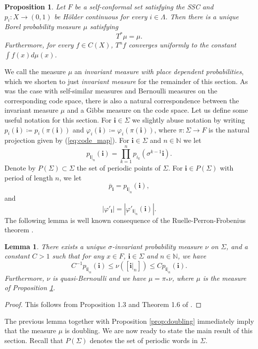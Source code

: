\documentclass{PRM}
\newcommand{\field}[1]{\mathbb{#1}}
\newcommand{\N}{\field{N}}
\theoremstyle{plain}
\newtheorem{lemma}[thm]{Lemma}
\newtheorem{prop}[thm]{Proposition}
\theoremstyle{definition}
\theoremstyle{remark}
\begin{document}
\begin{prop}\label{prop:invmeas}
Let $F$ be a self-conformal set satisfying the SSC and $p_i\colon X\to (0,1)$ be Hölder continuous for every $i\in\Lambda$. Then there is a unique Borel probability measure $\mu$ satisfying
\begin{equation*}
    T^*\mu=\mu.
\end{equation*}
Furthermore, for every $f\in C(X)$, $T^nf$ converges uniformly to the constant $\int f(x)d \mu(x)$.
\end{prop}
We call the measure $\mu$ an \emph{invariant measure with place dependent probabilities}, which we shorten to just \emph{invariant measure} for the remainder of this section. As was the case with self-similar measures and Bernoulli measures on the corresponding code space, there is also a natural correspondence between the invariant measure $\mu$ and a Gibbs measure on the code space. Let us define some useful notation for this section. For $\mathbf{i}\in\Sigma$ we slightly abuse notation by writing $p_i(\mathbf{i})\coloneqq p_i(\pi(\mathbf{i}))$ and $\varphi_i(\mathbf{i})\coloneqq\varphi_i(\pi(\mathbf{i}))$, where $\pi\colon \Sigma\to F$ is the natural projection given by (\ref{eq:code_map}). For $\mathbf{i}\in\Sigma$ and $n\in\N$ we let
\begin{equation*}
    p_{\mathbf{i}|_n}(\mathbf{i}) =\prod_{k=1}^{n}p_{i_k}(\sigma^{k-1}\mathbf{i}).
\end{equation*}
Denote by $P(\Sigma)\subset\Sigma$ the set of periodic points of $\Sigma$. For $\mathbf{i}\in P(\Sigma)$ with period of length $n$, we let
\begin{equation*}
    \overline{p}_{\mathbf{i}}=p_{\mathbf{i}|_{n}}(\mathbf{i}),
\end{equation*}
and
\begin{equation*}
    |\varphi'_{\mathbf{i}}|=|\varphi'_{\mathbf{i}|_{n}}(\mathbf{i})|.
\end{equation*}
The following lemma is well known consequence of the Ruelle-Perron-Frobenius theorem \cite{Bow,Fan}.

\begin{lemma}\label{lemma:gibbs}
There exists a unique $\sigma$-invariant probability measure $\nu$ on $\Sigma$, and a constant $C>1$ such that for any $x\in F$, $\mathbf{i}\in\Sigma$ and $n\in\N$, we have
\begin{equation*}
    C^{-1}p_{\mathbf{i}|_n}(\mathbf{i})\leq \nu([\mathbf{i}|_n])\leq Cp_{\mathbf{i}|_n}(\mathbf{i}).
\end{equation*}
Furthermore, $\nu$ is quasi-Bernoulli and we have $\mu=\pi_*\nu$, where $\mu$ is the measure of Proposition \ref{prop:invmeas}. 
\end{lemma}
\begin{proof}
This follows from Proposition 1.3 and Theorem 1.6 of \cite{Fan}.
\end{proof}
The previous lemma together with Proposition \ref{prop:doubling} immediately imply that the measure $\mu$ is doubling. We are now ready to state the main result of this section. Recall that $P(\Sigma)$ denotes the set of periodic words in $\Sigma$.
\end{document}
